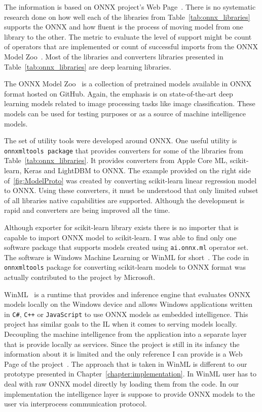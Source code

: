 \documentclass[english, 12pt, a4paper, elec, utf8, online]{aaltothesis}
\begin{document}
The information is based on ONNX project's Web Page~\cite{onnx_tools}. There is no systematic research done on how well each of the libraries from Table~\ref{tab:onnx_libraries} supports the ONNX and how fluent is the process of moving model from one library to the other. The metric to evaluate the level of support might be count of operators that are implemented or count of successful imports from the ONNX Model Zoo~\cite{onnx_model_zoo}. Most of the libraries and converters libraries presented in Table~\ref{tab:onnx_libraries} are deep learning libraries. 

The ONNX Model Zoo~\cite{onnx_model_zoo} is a collection of pretrained models available in ONNX format hosted on GitHub. Again, the emphasis is on state-of-the-art deep learning models related to image processing tasks like image classification. These models can be used for testing purposes or as a source of machine intelligence models.            

The set of utility tools were developed around ONNX. One useful utility is \texttt{onnxmltools package} that provides converters for some of the libraries from Table~\ref{tab:onnx_libraries}. It provides converters from Apple Core ML, scikit-learn, Keras and LightDBM to ONNX. The example provided on the right side of~\ref{fig:ModelProto} was created by converting scikit-learn linear regression model to ONNX. Using these converters, it must be understood that only limited subset of all libraries native capabilities are supported. Although the development is rapid and converters are being improved all the time.

Although exporter for scikit-learn library exists there is no importer that is capable to import ONNX model to scikit-learn. I was able to find only one software package that supports models created using \texttt{ai.onnx.ml} operator set. The software is Windows Machine Learning or WinML for short~\cite{winml}. The code in \texttt{onnxmltools} package for converting scikit-learn models to ONNX format was actually contributed to the project by Microsoft. 

WinML~\cite{winml} is a runtime that provides and inference engine that evaluates ONNX models locally on the Windows device and allows Windows applications written in \texttt{C\#}, \texttt{C++} or \texttt{JavaScript} to use ONNX models as embedded intelligence. This project has similar goals to the IL when it comes to serving models locally. Decoupling the machine intelligence from the application into a separate layer that is provide locally as services. Since the project is still in its infancy the information about it is limited and the only reference I can provide is a Web Page of the project~\cite{winml}. The approach that is taken in WinML is different to our prototype presented in Chapter~\ref{chapter:implementation}. In WinML user has to deal with raw ONNX model directly by loading them from the code. In our implementation the intelligence layer is suppose to provide ONNX models to the user via interprocess communication protocol.
\end{document}
